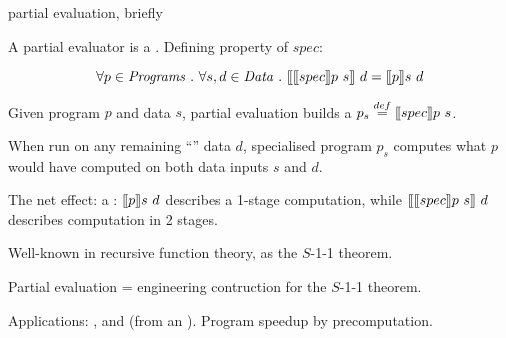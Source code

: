 \documentclass[12pt,fleqn,landscape]{article}
\begin{document}
\begin{slide}{partial evaluation, briefly}

A partial evaluator is a . Defining property of $spec$:

$$
\forall p\in \mathit{Programs}\ .\ \forall s, d \in \mathit{Data}\ . \ 
\lsem \lsem spec\rsem p\ s\rsem\ d = \lsem p\rsem s \ d
$$
\smallskip

\bi

\item Given program $p$ and  data $s$, partial evaluation builds a  $p_s \stackrel{def}{=} \mbox{$\lbrack\hspace{-0.3ex}\lbrack$} spec\mbox{$\rbrack\hspace{-0.3ex}\rbrack$} p\ s$. 

\item When run on any remaining ``'' data $d$, specialised program $p_s$ computes what $p$ would have computed on both data inputs $s$ and $d$.

\item The net effect: a :  $\lsem p\rsem s \ d$ describes a 1-stage computation, while $\mbox{$\lbrack\hspace{-0.3ex}\lbrack$} \mbox{$\lbrack\hspace{-0.3ex}\lbrack$} spec\mbox{$\rbrack\hspace{-0.3ex}\rbrack$} p\ s\mbox{$\rbrack\hspace{-0.3ex}\rbrack$}\ d$ describes computation in 2 stages.

 \hfill {}

\item Well-known in recursive function theory, as the $S$-1-1 theorem.

\item Partial evaluation = engineering contruction for the $S$-1-1 theorem.

\item Applications: , and  (from an ).
Program speedup by precomputation.

\ei
\end{slide}

\end{document}
